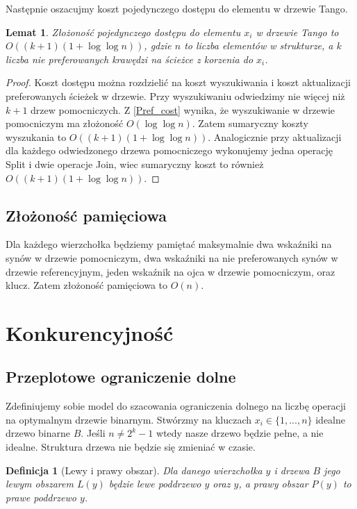 \documentclass[declaration,shortabstract]{iithesis}
\newcounter{thm}[section]
\theoremstyle{thm}
\newtheorem{definition}[thm]{Definicja}
\theoremstyle{remark}
\theoremstyle{plain}
\newtheorem{theorem}[thm]{Twierdzenie}
\theoremstyle{plain}
\theoremstyle{plain}
\newtheorem{lemma}[thm]{Lemat}
\begin{document}
Następnie oszacujmy koszt pojedynczego dostępu do elementu w drzewie Tango.
\begin{lemma} 
\label{Tango_cost} Złożoność pojedynczego dostępu do elementu \(x_i\) w drzewie Tango to \(O((k+1)(1+\log \log n))\), gdzie $n$ to liczba elementów w strukturze, a $k$ liczba nie preferowanych krawędzi na ścieżce z korzenia do \(x_i\). 
\end{lemma} 
\begin{proof} Koszt dostępu można rozdzielić na koszt wyszukiwania i koszt aktualizacji preferowanych ścieżek w drzewie. Przy wyszukiwaniu odwiedzimy nie więcej niż $k+1$ drzew pomocniczych. Z \ref{Pref_cost} wynika, że wyszukiwanie w drzewie pomocniczym ma złożoność \(O(\log \log n)\). Zatem sumaryczny koszty wyszukania to \(O((k+1)(1+\log \log n))\). Analogicznie przy aktualizacji dla każdego odwiedzonego drzewa pomocniczego wykonujemy jedna operację Split i dwie operacje Join, wiec sumaryczny koszt to również\(O((k+1)(1+\log \log n))\). 
\end{proof} 

\subsection{Złożoność pamięciowa} Dla każdego wierzchołka będziemy pamiętać maksymalnie dwa wskaźniki na synów w drzewie pomocniczym, dwa wskaźniki na nie preferowanych synów w drzewie referencyjnym, jeden wskaźnik na ojca w drzewie pomocniczym, oraz klucz. Zatem złożoność pamięciowa to \( O (n)\). 

\section{Konkurencyjność}   

\subsection{Przeplotowe ograniczenie dolne} Zdefiniujemy sobie model do szacowania ograniczenia dolnego na liczbę operacji na optymalnym drzewie binarnym. Stwórzmy na kluczach $x_i \in \{1, ..., n\}$ idealne drzewo binarne \(B\). Jeśli \( n \neq 2^k -1\) wtedy nasze drzewo będzie pełne, a nie idealne. Struktura drzewa nie będzie się zmieniać w czasie.  

\begin{definition}[Lewy i prawy obszar] 
Dla danego wierzchołka \(y\) i drzewa \(B\) jego lewym obszarem \(L(y)\) będzie lewe poddrzewo \(y\) oraz \(y\), a prawy obszar \(P(y)\) to prawe poddrzewo \(y\).
\end{definition}  
\end{document}
